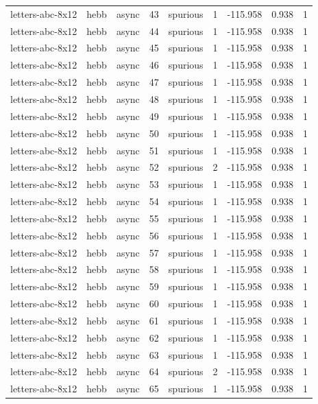 \begin{tabular}{lllrlrrrr}
letters-abc-8x12 & hebb & async & 43 & spurious & 1 & -115.958 & 0.938 & 1 \\
letters-abc-8x12 & hebb & async & 44 & spurious & 1 & -115.958 & 0.938 & 1 \\
letters-abc-8x12 & hebb & async & 45 & spurious & 1 & -115.958 & 0.938 & 1 \\
letters-abc-8x12 & hebb & async & 46 & spurious & 1 & -115.958 & 0.938 & 1 \\
letters-abc-8x12 & hebb & async & 47 & spurious & 1 & -115.958 & 0.938 & 1 \\
letters-abc-8x12 & hebb & async & 48 & spurious & 1 & -115.958 & 0.938 & 1 \\
letters-abc-8x12 & hebb & async & 49 & spurious & 1 & -115.958 & 0.938 & 1 \\
letters-abc-8x12 & hebb & async & 50 & spurious & 1 & -115.958 & 0.938 & 1 \\
letters-abc-8x12 & hebb & async & 51 & spurious & 1 & -115.958 & 0.938 & 1 \\
letters-abc-8x12 & hebb & async & 52 & spurious & 2 & -115.958 & 0.938 & 1 \\
letters-abc-8x12 & hebb & async & 53 & spurious & 1 & -115.958 & 0.938 & 1 \\
letters-abc-8x12 & hebb & async & 54 & spurious & 1 & -115.958 & 0.938 & 1 \\
letters-abc-8x12 & hebb & async & 55 & spurious & 1 & -115.958 & 0.938 & 1 \\
letters-abc-8x12 & hebb & async & 56 & spurious & 1 & -115.958 & 0.938 & 1 \\
letters-abc-8x12 & hebb & async & 57 & spurious & 1 & -115.958 & 0.938 & 1 \\
letters-abc-8x12 & hebb & async & 58 & spurious & 1 & -115.958 & 0.938 & 1 \\
letters-abc-8x12 & hebb & async & 59 & spurious & 1 & -115.958 & 0.938 & 1 \\
letters-abc-8x12 & hebb & async & 60 & spurious & 1 & -115.958 & 0.938 & 1 \\
letters-abc-8x12 & hebb & async & 61 & spurious & 1 & -115.958 & 0.938 & 1 \\
letters-abc-8x12 & hebb & async & 62 & spurious & 1 & -115.958 & 0.938 & 1 \\
letters-abc-8x12 & hebb & async & 63 & spurious & 1 & -115.958 & 0.938 & 1 \\
letters-abc-8x12 & hebb & async & 64 & spurious & 2 & -115.958 & 0.938 & 1 \\
letters-abc-8x12 & hebb & async & 65 & spurious & 1 & -115.958 & 0.938 & 1 \\

\end{tabular}
